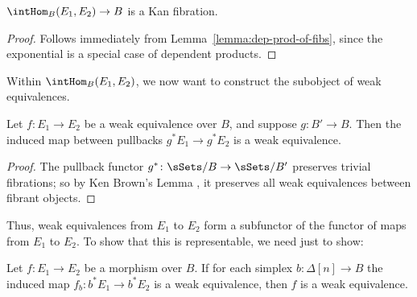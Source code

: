 \begin{lemma} \label{lemma:HOM_is_fib}
 $\intHom_B (E_1, E_2) \to B$ is a Kan fibration.
\end{lemma}

\begin{proof}
Follows immediately from Lemma~\ref{lemma:dep-prod-of-fibs}, since the exponential is a special case of dependent products.
\end{proof}

Within $\intHom_B (E_1, E_2)$, we now want to construct the subobject of weak equivalences.

\begin{lemma} \label{lemma:weqs_pull_back} %
Let $f \colon E_1 \to E_2$ be a weak equivalence over $B$, and suppose $g \colon B' \to B$. Then the induced map between pullbacks $g^*E_1 \to g^*E_2$ is a weak equivalence.
\end{lemma}

\begin{proof}
The pullback functor $g^* \colon \sSets/B \to \sSets/B'$ preserves trivial fibrations; so by Ken Brown's Lemma \cite[Lemma~1.1.12]{hovey:book}, it preserves all weak equivalences between fibrant objects.
\end{proof}

Thus, weak equivalences from $E_1$ to $E_2$ form a subfunctor of the functor of maps from $E_1$ to $E_2$.  To show that this is representable, we need just to show:

\begin{lemma} \label{lemma:weq_fibers}  %
 Let $f \colon E_1 \to E_2$ be a morphism over $B$.  If for each simplex $b \colon \Delta[n] \to B$ the induced map $f_b \colon b^*E_1 \to b^* E_2$ is a weak equivalence, then $f$ is a weak equivalence.
\end{lemma}

